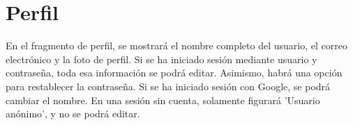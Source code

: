 \documentclass[a4paper,12pt]{report}
\begin{document}

\section{Perfil}
  En el fragmento de perfil, se mostrará el nombre completo del usuario, el correo electrónico y la foto de perfil. Si se ha iniciado sesión mediante usuario y contraseña, toda esa información se podrá editar. Asimismo, habrá una opción para restablecer la contraseña. Si se ha iniciado sesión con Google, se podrá cambiar el nombre. En una sesión sin cuenta, solamente figurará 'Usuario anónimo', y no se podrá editar.

\begin{figure}[htbp]
  \centering

\end{figure}
\end{document}
